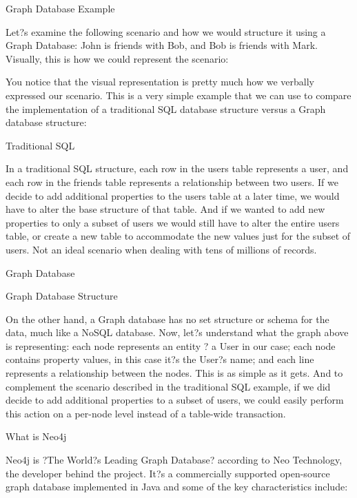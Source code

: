 \documentclass[12pt]{article}
\begin{document}
Graph Database Example

Let?s examine the following scenario and how we would structure it using a Graph Database: John is friends with Bob, and Bob is friends with Mark. Visually, this is how we could represent the scenario:



You notice that the visual representation is pretty much how we verbally expressed our scenario. This is a very simple example that we can use to compare the implementation of a traditional SQL database structure versus a Graph database structure:

Traditional SQL



In a traditional SQL structure, each row in the users table represents a user, and each row in the friends table represents a relationship between two users. If we decide to add additional properties to the users table at a later time, we would have to alter the base structure of that table. And if we wanted to add new properties to only a subset of users we would still have to alter the entire users table, or create a new table to accommodate the new values just for the subset of users. Not an ideal scenario when dealing with tens of millions of records.

Graph Database

Graph Database Structure

On the other hand, a Graph database has no set structure or schema for the data, much like a NoSQL database. Now, let?s understand what the graph above is representing: each node represents an entity ? a User in our case; each node contains property values, in this case it?s the User?s name; and each line represents a relationship between the nodes. This is as simple as it gets. And to complement the scenario described in the traditional SQL example, if we did decide to add additional properties to a subset of users, we could easily perform this action on a per-node level instead of a table-wide transaction.


What is Neo4j

Neo4j is ?The World?s Leading Graph Database? according to Neo Technology, the developer behind the project. It?s a commercially supported open-source graph database implemented in Java and some of the key characteristics include:
\end{document}
